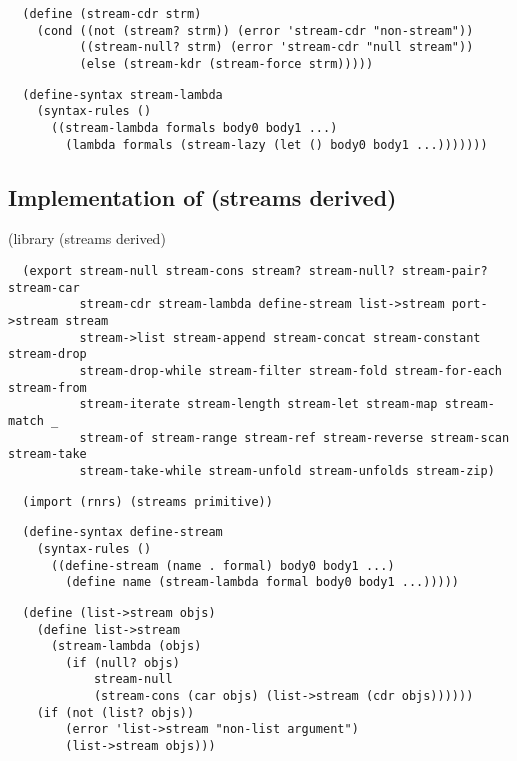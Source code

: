 \begin{verbatim}
  (define (stream-cdr strm)
    (cond ((not (stream? strm)) (error 'stream-cdr "non-stream"))
          ((stream-null? strm) (error 'stream-cdr "null stream"))
          (else (stream-kdr (stream-force strm)))))
\end{verbatim}

\begin{verbatim}
  (define-syntax stream-lambda
    (syntax-rules ()
      ((stream-lambda formals body0 body1 ...)
        (lambda formals (stream-lazy (let () body0 body1 ...)))))))
\end{verbatim}

\subsection{Implementation of (streams
derived)}\label{implementation-of-streams-derived}

(library (streams derived)

\begin{verbatim}
  (export stream-null stream-cons stream? stream-null? stream-pair? stream-car
          stream-cdr stream-lambda define-stream list->stream port->stream stream
          stream->list stream-append stream-concat stream-constant stream-drop
          stream-drop-while stream-filter stream-fold stream-for-each stream-from
          stream-iterate stream-length stream-let stream-map stream-match _
          stream-of stream-range stream-ref stream-reverse stream-scan stream-take
          stream-take-while stream-unfold stream-unfolds stream-zip)
\end{verbatim}

\begin{verbatim}
  (import (rnrs) (streams primitive))
\end{verbatim}

\begin{verbatim}
  (define-syntax define-stream
    (syntax-rules ()
      ((define-stream (name . formal) body0 body1 ...)
        (define name (stream-lambda formal body0 body1 ...)))))
\end{verbatim}

\begin{verbatim}
  (define (list->stream objs)
    (define list->stream
      (stream-lambda (objs)
        (if (null? objs)
            stream-null
            (stream-cons (car objs) (list->stream (cdr objs))))))
    (if (not (list? objs))
        (error 'list->stream "non-list argument")
        (list->stream objs)))
\end{verbatim}

